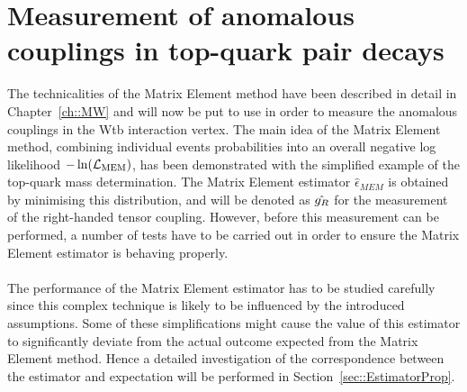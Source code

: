 \chapter{Measurement of anomalous couplings in top-quark pair decays} \label{ch::Analysis}

The technicalities of the Matrix Element method have been described in detail in Chapter~\ref{ch::MW} and will now be put to use in order to measure the anomalous couplings in the Wtb interaction vertex.
The main idea of the Matrix Element method, combining individual events probabilities into an overall negative log likelihood $-\ln(\mathcal{L}_{\textrm{MEM}})$, has been demonstrated with the simplified example of the top-quark mass determination.
The Matrix Element estimator $\hat{\epsilon}_{MEM}$ is obtained by minimising this distribution, and will be denoted as $\hat{g_{R}}$ for the measurement of the right-handed tensor coupling.
However, before this measurement can be performed, a number of tests have to be carried out in order to ensure the Matrix Element estimator is behaving properly.
\\
\\
The performance of the Matrix Element estimator has to be studied carefully since this complex technique is likely to be influenced by the introduced assumptions.
Some of these simplifications might cause the value of this estimator to significantly deviate from the actual outcome expected from the Matrix Element method.
Hence a detailed investigation of the correspondence between the estimator and expectation will be performed in Section~\ref{sec::EstimatorProp}.
